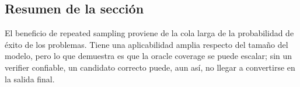 
\subsection{Resumen de la sección}

El beneficio de repeated sampling proviene de la cola larga de la probabilidad de éxito de los problemas. Tiene una aplicabilidad amplia respecto del tamaño del modelo, pero lo que demuestra es que la oracle coverage se puede escalar; sin un verifier confiable, un candidato correcto puede, aun así, no llegar a convertirse en la salida final.
